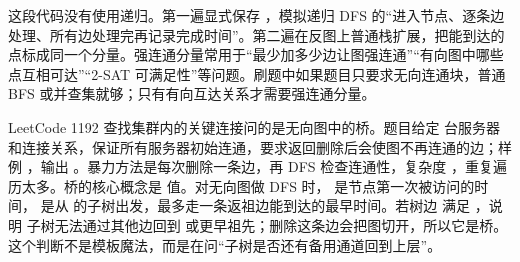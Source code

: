 这段代码没有使用递归。第一遍显式保存 ，模拟递归 DFS 的“进入节点、逐条边处理、所有边处理完再记录完成时间”。第二遍在反图上普通栈扩展，把能到达的点标成同一个分量。强连通分量常用于“最少加多少边让图强连通”“有向图中哪些点互相可达”“2-SAT 可满足性”等问题。刷题中如果题目只要求无向连通块，普通 BFS 或并查集就够；只有有向互达关系才需要强连通分量。

LeetCode 1192 查找集群内的关键连接问的是无向图中的桥。题目给定  台服务器和连接关系，保证所有服务器初始连通，要求返回删除后会使图不再连通的边；样例 ，输出 \code{[[1,3]]}。暴力方法是每次删除一条边，再 DFS 检查连通性，复杂度 ，重复遍历太多。桥的核心概念是  值。对无向图做 DFS 时， 是节点第一次被访问的时间， 是从  的子树出发，最多走一条返祖边能到达的最早时间。若树边  满足 ，说明  子树无法通过其他边回到  或更早祖先；删除这条边会把图切开，所以它是桥。这个判断不是模板魔法，而是在问“子树是否还有备用通道回到上层”。

